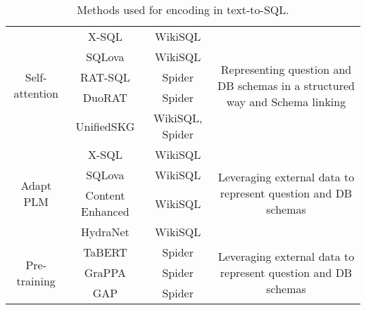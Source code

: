 \begin{table}
\begin{tabular}{|c|c|c|c|}
        \hline
        \multirow{5}{*}{Self-attention} & X-SQL               & WikiSQL                   & \multirow{5}{*}{\parbox{5cm}{Representing question and DB schemas in a structured way and Schema linking}} \\
                                        & SQLova              & WikiSQL                   &                                                                                                            \\
                                        & RAT-SQL             & Spider                    &                                                                                                            \\
                                        & DuoRAT              & Spider                    &                                                                                                            \\
                                        & UnifiedSKG          & WikiSQL, Spider           &                                                                                                            \\
        \hline
        \multirow{4}{*}{Adapt PLM}      & X-SQL               & WikiSQL                   & \multirow{4}{*}{\parbox{5cm}{Leveraging external data to represent question and DB schemas}}               \\
                                        & SQLova              & WikiSQL                   &                                                                                                            \\
                                        & Content Enhanced    & WikiSQL                   &                                                                                                            \\
                                        & HydraNet            & WikiSQL                   &                                                                                                            \\
        \hline
        \multirow{3}{*}{Pre-training}   & TaBERT              & Spider                    & \multirow{3}{*}{\parbox{5cm}{Leveraging external data to represent question and DB schemas}}               \\
                                        & GraPPA              & Spider                    &                                                                                                            \\
                                        & GAP                 & Spider                    &                                                                                                            \\
        \hline
    \end{tabular}
    \caption{Methods used for encoding in text-to-SQL.}
    \label{tab:methods}
\end{table}

